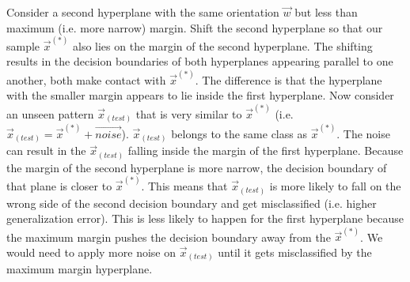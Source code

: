 \begin{frame}
{            Consider a second hyperplane with the same orientation $\vec w$ but less than maximum (i.e. more narrow) margin. Shift the second hyperplane so that our sample $\vec x^{(*)}$ also lies on the margin of the second hyperplane. The shifting results in the decision boundaries of both hyperplanes appearing parallel to one another, both make contact with $\vec x^{(*)}$. The difference is that the hyperplane with the smaller margin appears to lie inside the first hyperplane. Now consider an unseen pattern $\vec x_{(test)}$ that is very similar to $\vec x^{(*)}$ (i.e. $\vec x_{(test)} = \vec x^{(*)} + \vec {noise}$). $\vec x_{(test)}$ belongs to the same class as $\vec x^{(*)}$. The noise can result in the $\vec x_{(test)}$ falling inside the margin of the first hyperplane. Because the margin of the second hyperplane is more narrow, the decision boundary of that plane is closer to $\vec x^{(*)}$. This means that $\vec x_{(test)}$ is more likely to fall on the wrong side of the second decision boundary and get misclassified (i.e. higher generalization error). This is less likely to happen for the first hyperplane because the maximum margin pushes the decision boundary away from the $\vec x^{(*)}$. We would need to apply more noise on $\vec x_{(test)}$  until it gets misclassified by the maximum margin hyperplane.\vspace{5cm}
            
}
    
\end{frame}

